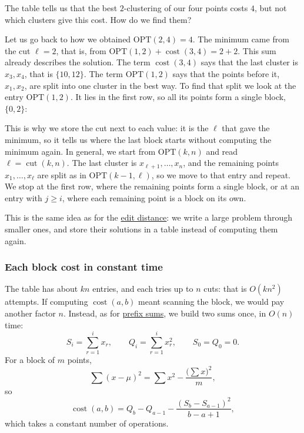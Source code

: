 \documentclass[a4paper,12pt,oneside]{report}
\newcommand{\OPT}{\mathrm{OPT}}
\begin{document}
The table tells us that the best $2$-clustering of our four points
costs $4$, but not which clusters give this cost. How do we find them?

Let us go back to how we obtained $\OPT(2,4)=4$. The minimum came
from the cut $\ell=2$, that is, from
$\OPT(1,2)+\operatorname{cost}(3,4)=2+2$. This sum already describes
the solution. The term $\operatorname{cost}(3,4)$ says that the last
cluster is $x_3,x_4$, that is $\{10,12\}$. The term $\OPT(1,2)$ says
that the points before it, $x_1,x_2$, are split into one cluster in
the best way. To find that split we look at the entry $\OPT(1,2)$.
It lies in the first row, so all its points form a single block,
$\{0,2\}$:
\begin{center}
\end{center}
This is why we store the cut next to each value: it is the $\ell$
that gave the minimum, so it tells us where the last block starts
without computing the minimum again. In general, we start from
$\OPT(k,n)$ and read $\ell=\operatorname{cut}(k,n)$. The last cluster
is $x_{\ell+1},\ldots,x_n$, and the remaining points $x_1,\ldots,x_\ell$
are split as in $\OPT(k-1,\ell)$, so we move to that entry and repeat.
We stop at the first row, where the remaining points form a single
block, or at an entry with $j\geq i$, where each remaining point is a
block on its own.

This is the same idea as for the
\hyperref[prop:ed-recurrence]{edit distance}: we write a large problem
through smaller ones, and store their solutions in a table instead of
computing them again.

\subsubsection{Each block cost in constant time}

The table has about $kn$ entries, and each tries up to $n$ cuts: that
is $O(kn^2)$ attempts. If computing $\operatorname{cost}(a,b)$ meant
scanning the block, we would pay another factor $n$. Instead, as for
\hyperref[prob:prefix-sums]{prefix sums}, we build two sums once, in
$O(n)$ time:
\[
  S_i=\sum_{r=1}^{i}x_r,\qquad Q_i=\sum_{r=1}^{i}x_r^2,
  \qquad S_0=Q_0=0.
\]
For a block of $m$ points,
\[
  \sum(x-\mu)^2=\sum x^2-\frac{\bigl(\sum x\bigr)^2}{m},
\]
so
\[
  \operatorname{cost}(a,b)
    =Q_b-Q_{a-1}-\frac{(S_b-S_{a-1})^2}{b-a+1},
\]
which takes a constant number of operations.
\end{document}
